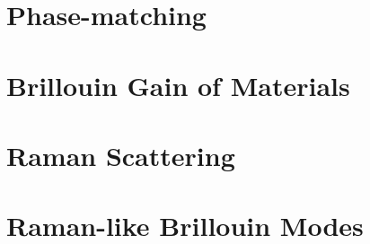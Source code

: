 \section{Phase-matching}
\label{sec:Introduction:Phase-matching}


\section{Brillouin Gain of Materials}
\label{subsec:Introduction:Gain}


\section{Raman Scattering}
\label{sec:Introduction:Raman}


\section{Raman-like Brillouin Modes}
\label{sec:Introduction:Raman-like}
